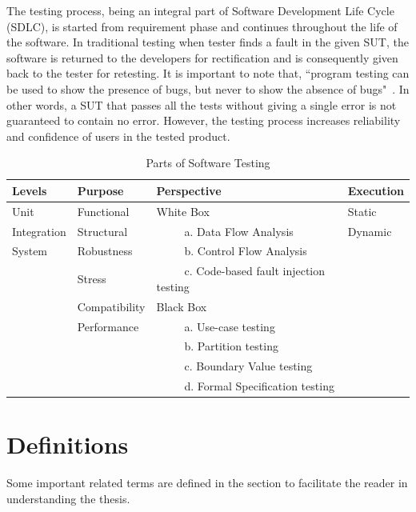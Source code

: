 The testing process, being an integral part of Software Development Life Cycle (SDLC), is started from requirement phase and continues throughout the life of the software. In traditional testing when tester finds a fault in the given SUT, the software is returned to the developers for rectification and is consequently given back to the tester for retesting. It is important to note that, ``program testing can be used to show the presence of bugs, but never to show the absence of bugs"~\cite{Dijkstra1972}. In other words, a SUT that passes all the tests without giving a single error is not guaranteed to contain no error. However, the testing process increases reliability and confidence of users in the tested product. \\


\begin{table}[ht]
\caption{Parts of Software Testing} %
\smallskip
\centering %
{\renewcommand{\arraystretch}{1.5} %
\begin{tabular}{| l | l | l | l | } %
\hline

Levels 					&Purpose		 		& Perspective							& Execution 	\\
\hline
Unit						& Functional			& White Box							& Static 		\\
Integration				& Structural			& ~~~~~a. Data Flow Analysis				& Dynamic	\\
System					& Robustness			& ~~~~~b. Control Flow Analysis			&			\\
						& Stress				& ~~~~~c. Code-based fault injection testing 	&			\\
						& Compatibility			& Black Box							&			\\
						& Performance			& ~~~~~a. Use-case testing				&			\\
						&					& ~~~~~b. Partition testing				&			\\
						&					& ~~~~~c. Boundary Value testing			&			\\
						&					& ~~~~~d. Formal Specification testing		&			\\



\hline %
\end{tabular}
}
\bigskip
\label{table:softwareTestingParts} %
\end{table}

\section{Definitions}
Some important related terms are defined in the section to facilitate the reader in understanding the thesis.


